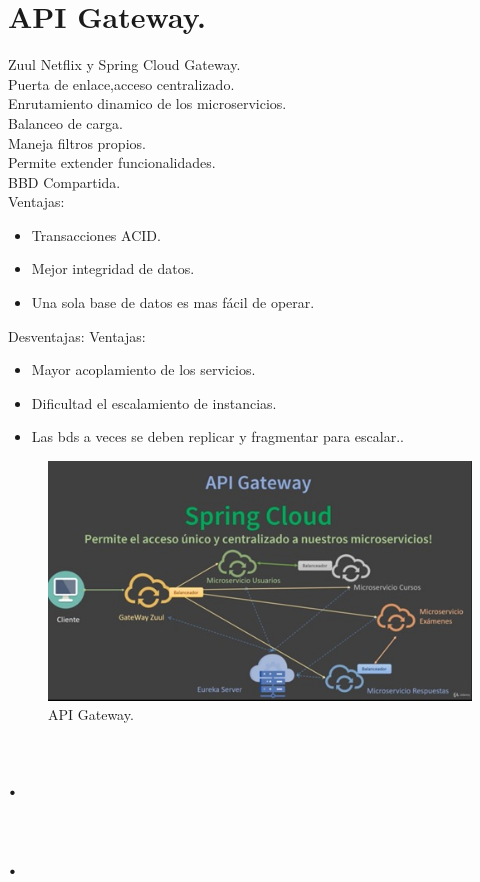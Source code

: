 \section{API Gateway.}
Zuul Netflix y Spring Cloud Gateway.\\
Puerta de enlace,acceso centralizado.\\
Enrutamiento dinamico de los microservicios.\\
Balanceo de carga.\\
Maneja filtros propios.\\
Permite extender funcionalidades.\\
BBD Compartida.\\
Ventajas:
\begin{itemize}
	\item Transacciones ACID.
	\item Mejor integridad de datos.
	\item Una sola base de datos es mas f\'acil de operar.
\end{itemize}
Desventajas:
Ventajas:
\begin{itemize}
	\item Mayor acoplamiento de los servicios.
	\item Dificultad  el escalamiento de instancias.
	\item Las bds a veces se deben replicar y fragmentar para escalar..
\end{itemize}
\begin{figure}[H] 
	\centering
	\includegraphics[scale=0.7]{images/c2_2.jpg}
	\caption{API Gateway.}
\end{figure}
\section{.}
\section{.}









